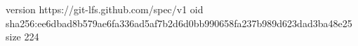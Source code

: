 version https://git-lfs.github.com/spec/v1
oid sha256:ee6dbad8b579ae6fa336ad5af7b2d6d0bb990658fa237b989d623dad3ba48e25
size 224
